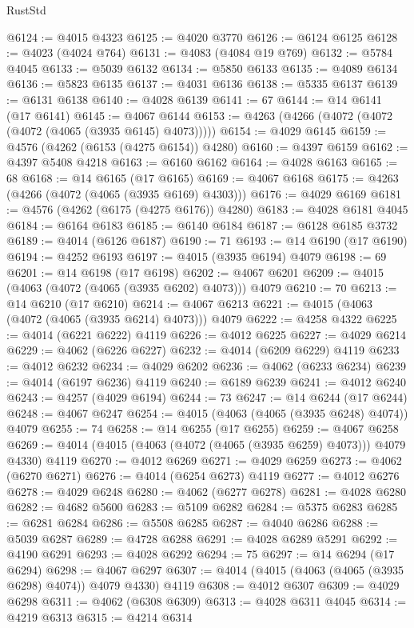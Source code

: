 \begin{lexlean}{RustStd}
\begin{coremodule}
@6124 := @4015 @4323
@6125 := @4020 @3770
@6126 := @6124 @6125
@6128 := @4023 (@4024 @764)
@6131 := @4083 (@4084 @19 @769)
@6132 := @5784 @4045
@6133 := @5039 @6132
@6134 := @5850 @6133
@6135 := @4089 @6134
@6136 := @5823 @6135
@6137 := @4031 @6136
@6138 := @5335 @6137
@6139 := @6131 @6138
@6140 := @4028 @6139
@6141 := 67
@6144 := @14 @6141 (@17 @6141)
@6145 := @4067 @6144
@6153 := @4263 (@4266 (@4072 (@4072 (@4072 (@4065 (@3935 @6145) @4073)))))
@6154 := @4029 @6145
@6159 := @4576 (@4262 (@6153 (@4275 @6154)) @4280)
@6160 := @4397 @6159
@6162 := @4397 @5408 @4218
@6163 := @6160 @6162
@6164 := @4028 @6163
@6165 := 68
@6168 := @14 @6165 (@17 @6165)
@6169 := @4067 @6168
@6175 := @4263 (@4266 (@4072 (@4065 (@3935 @6169) @4303)))
@6176 := @4029 @6169
@6181 := @4576 (@4262 (@6175 (@4275 @6176)) @4280)
@6183 := @4028 @6181 @4045
@6184 := @6164 @6183
@6185 := @6140 @6184
@6187 := @6128 @6185 @3732
@6189 := @4014 (@6126 @6187)
@6190 := 71
@6193 := @14 @6190 (@17 @6190)
@6194 := @4252 @6193
@6197 := @4015 (@3935 @6194) @4079
@6198 := 69
@6201 := @14 @6198 (@17 @6198)
@6202 := @4067 @6201
@6209 := @4015 (@4063 (@4072 (@4065 (@3935 @6202) @4073))) @4079
@6210 := 70
@6213 := @14 @6210 (@17 @6210)
@6214 := @4067 @6213
@6221 := @4015 (@4063 (@4072 (@4065 (@3935 @6214) @4073))) @4079
@6222 := @4258 @4322
@6225 := @4014 (@6221 @6222) @4119
@6226 := @4012 @6225
@6227 := @4029 @6214
@6229 := @4062 (@6226 @6227)
@6232 := @4014 (@6209 @6229) @4119
@6233 := @4012 @6232
@6234 := @4029 @6202
@6236 := @4062 (@6233 @6234)
@6239 := @4014 (@6197 @6236) @4119
@6240 := @6189 @6239
@6241 := @4012 @6240
@6243 := @4257 (@4029 @6194)
@6244 := 73
@6247 := @14 @6244 (@17 @6244)
@6248 := @4067 @6247
@6254 := @4015 (@4063 (@4065 (@3935 @6248) @4074)) @4079
@6255 := 74
@6258 := @14 @6255 (@17 @6255)
@6259 := @4067 @6258
@6269 := @4014 (@4015 (@4063 (@4072 (@4065 (@3935 @6259) @4073))) @4079 @4330) @4119
@6270 := @4012 @6269
@6271 := @4029 @6259
@6273 := @4062 (@6270 @6271)
@6276 := @4014 (@6254 @6273) @4119
@6277 := @4012 @6276
@6278 := @4029 @6248
@6280 := @4062 (@6277 @6278)
@6281 := @4028 @6280
@6282 := @4682 @5600
@6283 := @5109 @6282
@6284 := @5375 @6283
@6285 := @6281 @6284
@6286 := @5508 @6285
@6287 := @4040 @6286
@6288 := @5039 @6287
@6289 := @4728 @6288
@6291 := @4028 @6289 @5291
@6292 := @4190 @6291
@6293 := @4028 @6292
@6294 := 75
@6297 := @14 @6294 (@17 @6294)
@6298 := @4067 @6297
@6307 := @4014 (@4015 (@4063 (@4065 (@3935 @6298) @4074)) @4079 @4330) @4119
@6308 := @4012 @6307
@6309 := @4029 @6298
@6311 := @4062 (@6308 @6309)
@6313 := @4028 @6311 @4045
@6314 := @4219 @6313
@6315 := @4214 @6314

\end{coremodule}
\end{lexlean}
